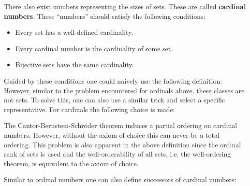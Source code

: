     There also exist numbers representing the sizes of sets. These are called \textbf{cardinal numbers}. These ``numbers'' should satisfy the following conditions:
    \begin{itemize}
        \item Every set has a well-defined cardinality.
        \item Every cardinal number is the cardinality of some set.
        \item Bijective sets have the same cardinality.
    \end{itemize}
    Guided by these conditions one could naively use the following definition:
    However, similar to the problem encountered for ordinals above, these classes are not sets. To solve this, one can also use a similar trick and select a specific representative. For cardinals the following choice is made:

    \begin{remark}[Ordering]
        The Cantor-Bernstein-Schr\"oder theorem induces a partial ordering on cardinal numbers. However, without the axiom of choice this can never be a total ordering. This problem is also apparent in the above definition since the ordinal rank of sets is used and the well-orderability of all sets, i.e. the well-ordering theorem, is equivalent to the axiom of choice.
    \end{remark}

    Similar to ordinal numbers one can also define successors of cardinal numbers:



